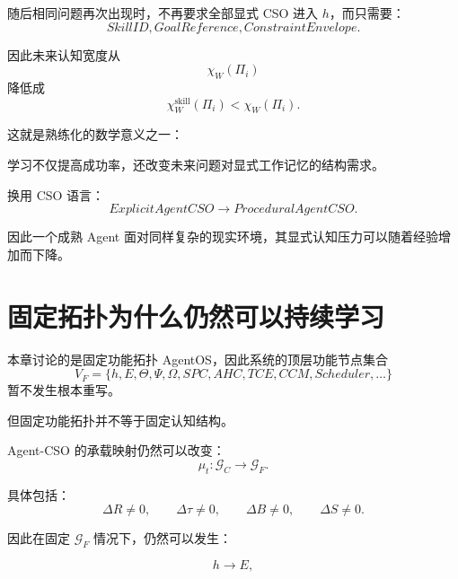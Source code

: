 随后相同问题再次出现时，不再要求全部显式 CSO 进入 $h$，而只需要：
\begin{equation}
SkillID,
GoalReference,
ConstraintEnvelope.
\end{equation}

因此未来认知宽度从
\begin{equation}
\chi_W(\Pi_i)
\end{equation}
降低成
\begin{equation}
\chi_W^{\mathrm{skill}}(\Pi_i)
<
\chi_W(\Pi_i).
\end{equation}

这就是熟练化的数学意义之一：

\begin{statementbox}
学习不仅提高成功率，还改变未来问题对显式工作记忆的结构需求。
\end{statementbox}

换用 CSO 语言：
\begin{equation}
ExplicitAgentCSO
\rightarrow
ProceduralAgentCSO.
\end{equation}

因此一个成熟 Agent 面对同样复杂的现实环境，其显式认知压力可以随着经验增加而下降。

\section{固定拓扑为什么仍然可以持续学习}

本章讨论的是固定功能拓扑 AgentOS，因此系统的顶层功能节点集合
\begin{equation}
V_F
=
\{
h,E,\Theta,\Psi,\Omega,
SPC,AHC,TCE,CCM,Scheduler,\ldots
\}
\end{equation}
暂不发生根本重写。

但固定功能拓扑并不等于固定认知结构。

Agent-CSO 的承载映射仍然可以改变：
\begin{equation}
\mu_t:
\mathcal G_C
\rightarrow
\mathcal G_F.
\end{equation}

具体包括：
\begin{equation}
\Delta R\neq0,
\qquad
\Delta \tau\neq0,
\qquad
\Delta B\neq0,
\qquad
\Delta S\neq0.
\end{equation}

因此在固定 $\mathcal G_F$ 情况下，仍然可以发生：

\begin{equation}
h
\rightarrow
E,
\end{equation}

